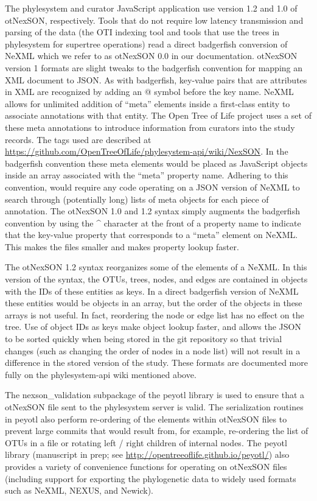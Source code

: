 \documentclass{bioinfo}
\newcommand{\ps}{phylesystem\xspace}
\newcommand{\otol}{Open Tree of Life\xspace}
\newcommand{\nexson}{otNexSON\xspace}
\newcommand{\js}{JavaScript\xspace}
\begin{document}
\begin{methods}
The \ps and curator \js application use version 1.2 and 1.0 of \nexson, respectively.
Tools that do not require low latency transmission and parsing of the data (the OTI indexing tool
    and tools that use the trees in \ps for supertree operations)
    read a direct badgerfish \citep{badgerfish} conversion of NeXML which we refer to as \nexson 0.0 in our documentation.
\nexson version 1 formats are slight tweaks to the badgerfish convention \citep{badgerfish} for mapping an XML document to JSON.
As with badgerfish, key-value pairs that are attributes in XML are recognized by adding an @ symbol before the key name.
NeXML allows for unlimited addition of ``meta'' elements inside a first-class entity to associate annotations with that entity.
The \otol project uses a set of these meta annotations to introduce information from curators into the study records.
The tags used are described at \url{https://github.com/OpenTreeOfLife/phylesystem-api/wiki/NexSON}.
In the badgerfish convention these meta elements would be placed as \js objects inside an array associated with the ``meta'' property name.
Adhering to this convention, would require any code operating on a JSON version of NeXML to search through (potentially
    long) lists of meta objects for each piece of annotation.
The \nexson 1.0 and 1.2 syntax simply augments the badgerfish convention by using the \^{} character at the front of a
    property name to indicate that the key-value property that corresponds to a ``meta'' element on NeXML.
This makes the files smaller and makes property lookup faster.

The \nexson 1.2 syntax reorganizes some of the elements of a NeXML.
In this version of the syntax, the OTUs, trees, nodes, and edges are contained in objects with the IDs of these entities as keys.
In a direct badgerfish version of NeXML these entities would be objects in an array, but the order of the objects
    in these arrays is not useful.
In fact, reordering the node or edge list has no effect on the tree.
Use of object IDs as keys make object lookup faster, and allows the JSON to be sorted quickly when being stored in 
    the git repository so that trivial changes (such as changing the order of nodes in a node list) will not result in 
    a difference in the stored version of the study.
These formats are documented more fully on the \ps-api wiki mentioned above.

The nexson\_validation subpackage of the peyotl library is used to ensure that a \nexson file sent to the \ps
    server is valid.
The serialization routines in peyotl also perform re-ordering of the elements within \nexson files to
    prevent large commits that would result from, for example, re-ordering the list of OTUs in a file or
    rotating left / right children of internal nodes.
The peyotl library (manuscript in prep; see \url{http://opentreeoflife.github.io/peyotl/}) also 
    provides a variety of convenience functions for operating on \nexson files (including support
    for exporting the phylogenetic data to widely used formats such as NeXML, NEXUS, and Newick).


\end{methods}
\end{document}
